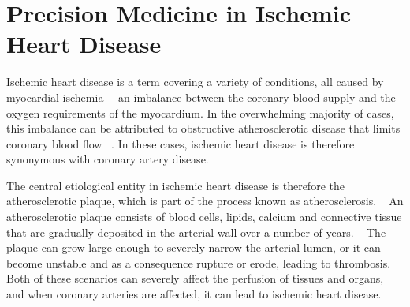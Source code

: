 \chapter{Precision Medicine in Ischemic Heart Disease}
\label{pm-in-ihd}

Ischemic heart disease is a term covering a variety of conditions, 
all caused by myocardial ischemia---%
an imbalance between the coronary blood supply and the 
oxygen requirements of the myocardium.
In the overwhelming majority of cases, 
this imbalance can be attributed to obstructive atherosclerotic disease 
that limits coronary blood flow
~\autocite{kumarRobbins2014}.
In these cases, ischemic heart disease is therefore synonymous 
with coronary artery disease.

The central etiological entity in ischemic heart disease
is therefore the atherosclerotic plaque, 
which is part of the process known as atherosclerosis. 
~\autocite{kumarRobbins2014}
An atherosclerotic plaque consists of blood cells, lipids, calcium 
and connective tissue that are gradually deposited in the arterial wall 
over a number of years.
~\autocite{libbyPathophysiology2005}
The plaque can grow large enough to severely narrow the arterial lumen,
or it can become unstable and as a consequence rupture or erode,
leading to thrombosis.%
Both of these scenarios can severely affect 
the perfusion of tissues and organs, 
and when coronary arteries are affected,
it can lead to ischemic heart disease.

